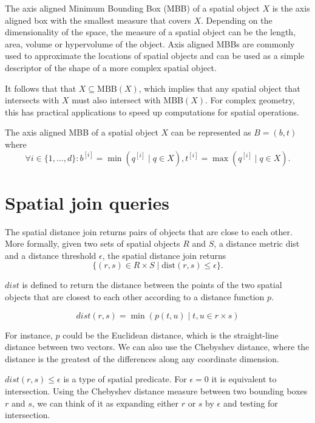 The axis aligned Minimum Bounding Box (MBB) of a spatial object \(X\) is the axis aligned box with the smallest measure that covers \(X\). Depending on the dimensionality of the space, the measure of a spatial object can be the length, area, volume or hypervolume of the object. Axis aligned MBBs are commonly used to approximate the locations of spatial objects and can be used as a simple descriptor of the shape of a more complex spatial object.

It follows that that \(X \subseteq \textrm{MBB}(X)\), which implies that any spatial object that intersects with \(X\) must also intersect with \(\textrm{MBB}(X)\). For complex geometry, this has practical applications to speed up computations for spatial operations.

The axis aligned MBB of a spatial object \(X\) can be represented as \(B = (b, t)\) where
\[
  \forall i \in \{ 1, \dotsc, d \} :
  b^{[i]} = \min\left( q^{[i]} \mid q \in X \right)
  ,
  t^{[i]} = \max\left( q^{[i]} \mid q \in X \right).
\]

\section{Spatial join queries}

The spatial distance join returns pairs of objects that are close to each other. More formally, given two sets of spatial objects \(R\) and \(S\), a distance metric dist and a distance threshold \(\epsilon\), the spatial distance join returns
\[
  \{ (r, s) \in R \times S \mid \mathrm{dist}(r, s) \leq \epsilon \}.
\]

\(dist\) is defined to return the distance between the points of the two spatial objects that are closest to each other according to a distance function \(p\).

\[
  dist(r, s) = \min\left(p(t, u) \mid t, u \in r \times s \right)
\]

For instance, \(p\) could be the Euclidean distance, which is the straight-line distance between two vectors. We can also use the Chebyshev distance, where the distance is the greatest of the differences along any coordinate dimension.

\(dist(r, s) \leq \epsilon\) is a type of spatial predicate. For \(\epsilon = 0\) it is equivalent to intersection. Using the Chebyshev distance measure between two bounding boxes \(r\) and \(s\), we can think of it as expanding either \(r\) or \(s\) by \(\epsilon\) and testing for intersection.


